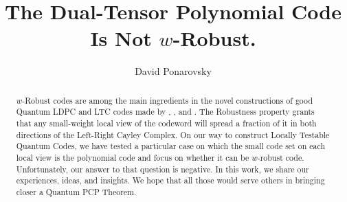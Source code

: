 \documentclass[manuscript,screen,review]{acmart}
\begin{document}
\newcommand{\commentt}[1]{\textcolor{blue}{ \textbf{[COMMENT]} #1}}
\newcommand{\ctt}[1]{\commentt{#1}}
\newcommand{\prb}[1]{ \mathbf{Pr} \left[ {#1} \right]}
\newcommand{\expp}[1]{ \mathbf{E} \left[ {#1} \right]  }
\newcommand{\onotation}[1]{\(\mathcal{O} \left( {#1}  \right) \)}
\newcommand{\ona}[1]{\onotation{#1}}
\newcommand{\Cpa}{[n, \rho n, \delta n]}
\newcommand{\Jvv}{ \bar{J_{v}} } 
\newcommand{\Cvv}{ \tilde{C_{v}} } 

\newcommand{\Gz}{ G_{z}^{\delta} } 
\newcommand{ \Tann } {  \mathcal{T}\left( G, C_0 \right) }
\newcommand{\ireducable}{ireducable \hyperref[ire]{[\ref{ire}]} }
\newcommand{\cutUU}{E(U_{-1} \bigcup U_{+1} ,U)} 
\newcommand{\wcutUU}{w\left( E(U_{-1} \bigcup U_{+1} ,U)  \right)}
\newcommand{\testgo}{  \mathcal{T}\left(J, q , C_{0}\right) } 

\newcommand{\duC}{\left( C_{A}^{\perp}\otimes C_{B}^{\perp} \right)^{\perp}}
\newcommand{\duduC}{\left( C_{A}\otimes C_{B}\right)^{\perp}}
\title{The Dual-Tensor Polynomial Code Is Not $w$-Robust. } 
\author{David Ponarovsky}

\ifdefined\ACM
{}
\else
\maketitle
\fi
%
\ifdefined\ACM
\maketitle
\fi
%
%   

\begin{abstract}
  $w$-Robust codes are among the main ingredients in the novel constructions of good Quantum LDPC and LTC codes made by \cite{Dinur}, \cite{leverrier2022quantum}, and \cite{Pavel}. The Robustness property grants that any small-weight local view of the codeword will spread a fraction of it in both directions of the Left-Right Cayley Complex. On our way to construct Locally Testable Quantum Codes, we have tested a particular case on which the small code set on each local view is the polynomial code and focus on whether it can be $w$-robust code. Unfortunately, our answer to that question is negative. In this work, we share our experiences, ideas, and insights. We hope that all those would serve others in bringing closer a Quantum PCP Theorem.
\end{abstract}  
\end{document}
